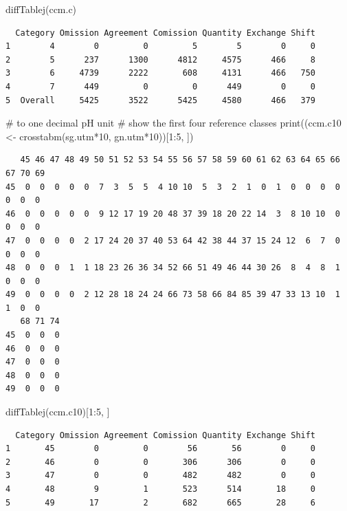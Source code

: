\documentclass[
  letterpaper,
  DIV=11,
  numbers=noendperiod]{scrartcl}
\newenvironment{Shaded}{\begin{snugshade}}{\end{snugshade}}
\newcommand{\CommentTok}[1]{\textcolor[rgb]{0.37,0.37,0.37}{#1}}
\newcommand{\DecValTok}[1]{\textcolor[rgb]{0.68,0.00,0.00}{#1}}
\newcommand{\FunctionTok}[1]{\textcolor[rgb]{0.28,0.35,0.67}{#1}}
\newcommand{\NormalTok}[1]{\textcolor[rgb]{0.00,0.23,0.31}{#1}}
\newcommand{\OtherTok}[1]{\textcolor[rgb]{0.00,0.23,0.31}{#1}}
\newcommand{\SpecialCharTok}[1]{\textcolor[rgb]{0.37,0.37,0.37}{#1}}
\begin{document}
\begin{Shaded}
\begin{Highlighting}[]
\FunctionTok{diffTablej}\NormalTok{(ccm.c)}
\end{Highlighting}
\end{Shaded}

\begin{verbatim}
  Category Omission Agreement Comission Quantity Exchange Shift
1        4        0         0         5        5        0     0
2        5      237      1300      4812     4575      466     8
3        6     4739      2222       608     4131      466   750
4        7      449         0         0      449        0     0
5  Overall     5425      3522      5425     4580      466   379
\end{verbatim}

\begin{Shaded}
\begin{Highlighting}[]
\CommentTok{\# to one decimal pH unit}
\CommentTok{\# show the first four reference classes}
\FunctionTok{print}\NormalTok{((ccm.c10 }\OtherTok{\textless{}{-}} \FunctionTok{crosstabm}\NormalTok{(sg.utm}\SpecialCharTok{*}\DecValTok{10}\NormalTok{, gn.utm}\SpecialCharTok{*}\DecValTok{10}\NormalTok{))[}\DecValTok{1}\SpecialCharTok{:}\DecValTok{5}\NormalTok{, ])}
\end{Highlighting}
\end{Shaded}

\begin{verbatim}
   45 46 47 48 49 50 51 52 53 54 55 56 57 58 59 60 61 62 63 64 65 66 67 70 69
45  0  0  0  0  0  7  3  5  5  4 10 10  5  3  2  1  0  1  0  0  0  0  0  0  0
46  0  0  0  0  0  9 12 17 19 20 48 37 39 18 20 22 14  3  8 10 10  0  0  0  0
47  0  0  0  0  2 17 24 20 37 40 53 64 42 38 44 37 15 24 12  6  7  0  0  0  0
48  0  0  0  1  1 18 23 26 36 34 52 66 51 49 46 44 30 26  8  4  8  1  0  0  0
49  0  0  0  0  2 12 28 18 24 24 66 73 58 66 84 85 39 47 33 13 10  1  1  0  0
   68 71 74
45  0  0  0
46  0  0  0
47  0  0  0
48  0  0  0
49  0  0  0
\end{verbatim}

\begin{Shaded}
\begin{Highlighting}[]
\FunctionTok{diffTablej}\NormalTok{(ccm.c10)[}\DecValTok{1}\SpecialCharTok{:}\DecValTok{5}\NormalTok{, ]}
\end{Highlighting}
\end{Shaded}

\begin{verbatim}
  Category Omission Agreement Comission Quantity Exchange Shift
1       45        0         0        56       56        0     0
2       46        0         0       306      306        0     0
3       47        0         0       482      482        0     0
4       48        9         1       523      514       18     0
5       49       17         2       682      665       28     6
\end{verbatim}
\end{document}
